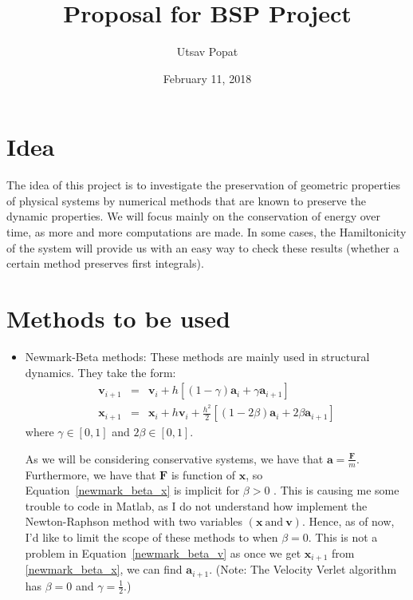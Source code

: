 \documentclass[a4paper, 12pt]{article}
\title{Proposal for BSP Project}
\author{Utsav Popat}
\date{February 11, 2018}
\renewcommand{\vec}[1]{\mathbf{#1}}
\begin{document}
	\maketitle
	\section{Idea}
The idea of this project is to investigate the preservation of geometric properties of physical systems by numerical methods that are known to preserve the dynamic properties. We will focus mainly on the conservation of energy over time, as more and more computations are made. In some cases, the Hamiltonicity of the system will provide us with an easy way to check these results (whether a certain method preserves first integrals).

	\section{Methods to be used}
\begin{itemize}
	\item Newmark-Beta methods: \newline
These methods are mainly used in structural dynamics. They take the form:
\begin{eqnarray}
	\vec{v}_{i+1} & = & \vec{v}_{i} + h\left[\left(1-\gamma \right)\vec{a}_{i} + \gamma \vec{a}_{i+1}\right] \label{newmark_beta_v}\\
	\vec{x}_{i+1} & = & \vec{x}_{i} + h\vec{v}_{i} + \frac{h^2}{2}\left[ \left(1-2\beta \right)\vec{a}_{i} + 2\beta \vec{a}_{i+1}\right] \label{newmark_beta_x}
\end{eqnarray} where $\gamma \in \left[0, 1 \right]$ and $2\beta \in \left[0, 1 \right]$.

As we will be considering conservative systems, we have that $ \vec{a}  = \frac{\vec{F}}{m} $. Furthermore, we have that $\vec{F}$ is function of $\vec{x}$, so Equation~\ref{newmark_beta_x} is implicit for $ \beta > 0 $ . This is causing me some trouble to code in Matlab, as I do not understand how implement the Newton-Raphson method with two variables $\left(\vec{x} ~\mbox{and}~ \vec{v}\right)$. Hence, as of now, I'd like to limit the scope of these methods to when $\beta = 0$. This is not a problem in Equation~\ref{newmark_beta_v} as once we get $\vec{x}_{i+1}$ from \ref{newmark_beta_x}, we can find $\vec{a}_{i+1}$. (Note: The Velocity Verlet \cite{Verlet1967} algorithm has $\beta = 0$ and $\gamma = \frac{1}{2} $.) 
\end{itemize}
\end{document}
